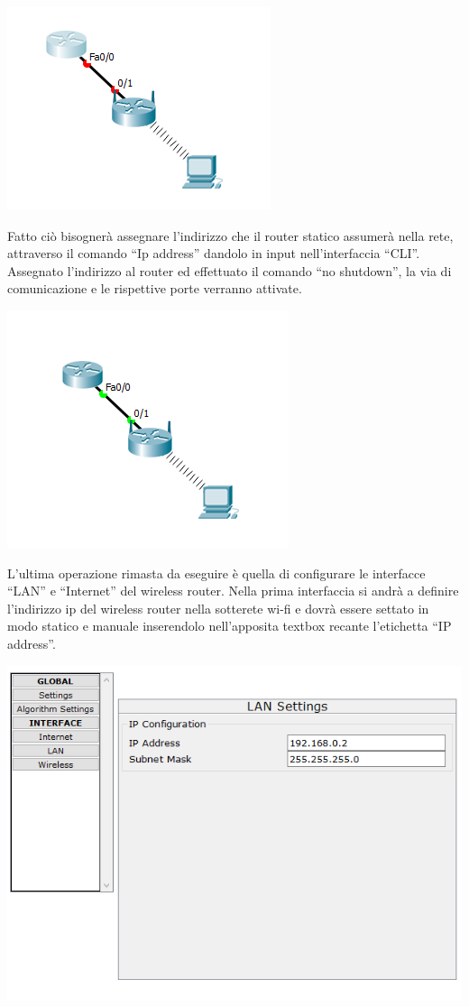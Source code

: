 \begin{center}
    \includegraphics[width=0.4\linewidth]{images/08.wireless/13.png}
\end{center}

Fatto ciò bisognerà assegnare l’indirizzo che il router statico assumerà nella rete, attraverso il comando “Ip address” dandolo in input nell’interfaccia “CLI”.
Assegnato l’indirizzo al router ed effettuato il comando “no shutdown”, la via di comunicazione e le rispettive porte verranno attivate.

\begin{center}
    \includegraphics[width=0.4\linewidth]{images/08.wireless/14.png}
\end{center}

L’ultima operazione rimasta da eseguire è quella di configurare le interfacce “LAN” e “Internet” del wireless router. Nella prima interfaccia si andrà a definire l’indirizzo ip del wireless router nella sotterete wi-fi e dovrà essere settato in modo statico e manuale inserendolo nell’apposita textbox recante l’etichetta “IP address”.

\begin{center}
    \includegraphics[width=\linewidth]{images/08.wireless/15.png}
\end{center}

